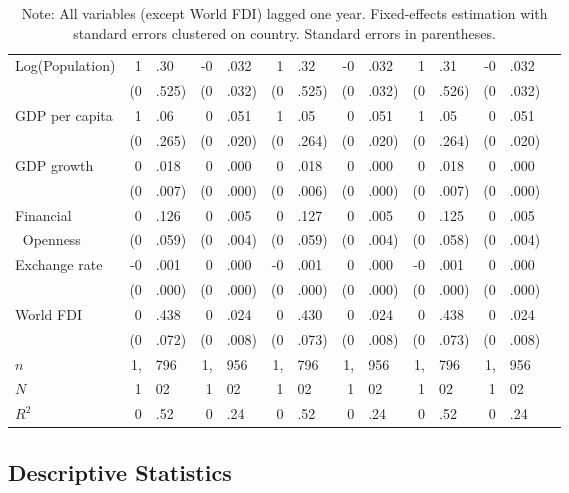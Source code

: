 \documentclass[12pt,onesided]{amsart}
\begin{document}
\begin{table}[ht]
{\begin{tabular}{lr@{} lr@{}lr@{}lr@{}lr@{}lr@{}lr@{} }
	\multirow{2}{*}{Log(Population)} & 1&.30 & -0&.032 & 1&.32 & -0&.032 & 1&.31 & -0&.032 \\
	& (0&.525) & (0&.032) & (0&.525) & (0&.032) & (0&.526) & (0&.032) \\
	\multirow{2}{*}{GDP per capita} & 1&.06 & 0&.051 & 1&.05 & 0&.051 & 1&.05 & 0&.051 \\
	& (0&.265) & (0&.020) & (0&.264) & (0&.020) & (0&.264) & (0&.020) \\
	\multirow{2}{*}{GDP growth} & 0&.018 & 0&.000 & 0&.018 & 0&.000 & 0&.018 & 0&.000 \\
	& (0&.007) & (0&.000) & (0&.006) & (0&.000) & (0&.007) &(0&.000) \\
	Financial & 0&.126 & 0&.005 & 0&.127 & 0&.005 & 0&.125 & 0&.005 \\
	$\;\;$Openness & (0&.059) & (0&.004) & (0&.059) & (0&.004) & (0&.058) &(0&.004) \\
	\multirow{2}{*}{Exchange rate} & -0&.001 & 0&.000 & -0&.001 & 0&.000 & -0&.001 & 0&.000 \\
	& (0&.000) & (0&.000) & (0&.000) & (0&.000) & (0&.000) &(0&.000) \\	
	\multirow{2}{*}{World FDI} & 0&.438 & 0&.024 & 0&.430 & 0&.024 & 0&.438 & 0&.024 \\
	& (0&.072) & (0&.008) & (0&.073) & (0&.008) & (0&.073) &(0&.008) \\ \hline
	$n$ & 1,&796 & 1,&956 & 1,&796 & 1,&956 & 1,&796 & 1,&956 \\
	$N$ & 1&02 & 1&02 & 1&02 & 1&02 & 1&02 & 1&02 \\
	$R^{2}$ & 0&.52 & 0&.24 & 0&.52 & 0&.24 & 0&.52 & 0&.24 \\
	\hline\hline
\end{tabular}
\caption*{Note: All variables (except World FDI) lagged one year. Fixed-effects estimation with standard errors clustered on country. Standard errors in parentheses. }
}
\end{table}
\FloatBarrier

\subsection*{Descriptive Statistics}
\end{document}
